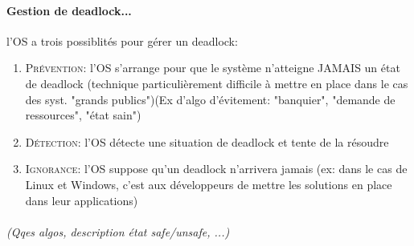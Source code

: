 {\paragraph{Gestion de deadlock...} l'OS  a trois possiblités pour gérer un deadlock:
\begin{enumerate}
\item \textsc{Prévention}: l'OS s'arrange pour que le système n'atteigne JAMAIS un état de deadlock (technique particulièrement difficile à mettre en place dans le cas des syst. "grands publics")(Ex d'algo d'évitement: "banquier", "demande de ressources", "état sain")
\item \textsc{Détection}: l'OS détecte une situation de deadlock et tente de la résoudre
\item \textsc{Ignorance}: l'OS suppose qu'un deadlock n'arrivera jamais (ex: dans le cas de Linux et Windows, c'est aux développeurs de mettre les solutions en place dans leur applications)
\end{enumerate}


\paragraph{}
\textit{(Qqes algos, description état safe/unsafe, ...)}
}


\item{}
{}


